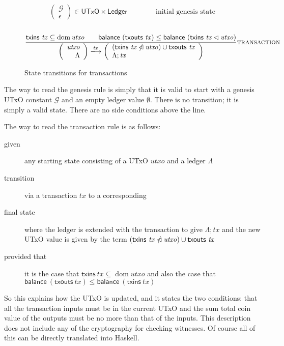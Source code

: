 \documentclass[11pt,a4paper]{article}
\DeclareMathOperator{\dom}{dom}
\newcommand{\restrictdom}{\lhd}
\newcommand{\subtractdom}{\mathbin{\slashed{\restrictdom}}}
\newcommand{\union}{\cup}
\newcommand{\var}[1]{\mathit{#1}}
\newcommand{\fun}[1]{\mathsf{#1}}
\newcommand{\type}[1]{\mathsf{#1}}
\newcommand{\transitionarrow}[2]{\xlongrightarrow[\textsc{#1}]{#2}}
\begin{document}
\begin{figure}
\begin{equation*}
  \left(\begin{array}{r}
    \mathcal{G} \\
    \epsilon
  \end{array}\right)
  \in \type{UTxO} \times \type{Ledger}
\qquad\qquad
\text{initial genesis state}
\end{equation*}
%
\\[1em]
%
\begin{equation*}
\frac{
  \fun{txins} ~ \var{tx} \subseteq \dom \var{utxo} \qquad
  \fun{balance}~(\fun{txouts}~\var{tx}) \leq \fun{balance}~(\fun{txins} ~ \var{tx} \restrictdom \var{utxo})
}{
  \left(\begin{array}{r}
    \var{utxo} \\
    \Lambda
  \end{array}\right)
  \transitionarrow{}{\var{tx}}
  \left(\begin{array}{l}
  (\fun{txins} ~ \var{tx} \subtractdom \var{utxo}) \union \fun{txouts}~\var{tx} \\
  \Lambda ; \var{tx}
  \end{array}\right)
}
\textsc{transaction}
\end{equation*}
\caption{State transitions for transactions}
\label{fig:transaction_transitions}
\end{figure}

The way to read the genesis rule is simply that it is valid to start with a
genesis UTxO constant $\mathcal{G}$ and an empty ledger value
$\emptyset$. There is no transition; it is simply a valid state. There are no
side conditions above the line.

The way to read the transaction rule is as follows:
\begin{description}
\item[given] any starting state consisting of a UTxO $\var{utxo}$ and a ledger
             $\Lambda$
\item[transition] via a transaction $tx$ to a corresponding
\item[final state] where the ledger is extended with the transaction to give
     $\Lambda ; \var{tx}$ and the new UTxO value is given by the term
     $(\fun{txins} ~ \var{tx} \subtractdom \var{utxo}) \union \fun{txouts}~\var{tx}$
\item[provided that] it is the case that 
     $\fun{txins} ~ \var{tx} \subseteq \dom \var{utxo}$ and also the case that
     $\fun{balance}~(\fun{txouts}~\var{tx}) \leq \fun{balance}~(\fun{txins} ~ \var{tx})$
\end{description}
%
So this explains how the UTxO is updated, and it states the two conditions:
that all the transaction inputs must be in the current UTxO and the sum total
coin value of the outputs must be no more than that of the inputs. This
description does not include any of the cryptography for checking witnesses.
Of course all of this can be directly translated into Haskell.
\end{document}
